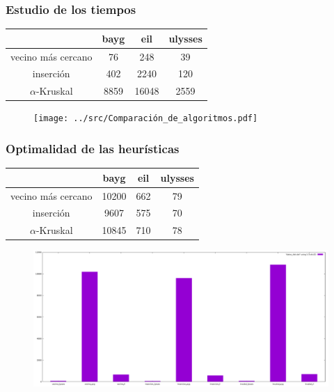 \documentclass[13pt]{beamer}
\begin{document}
	\begin{frame}
		\frametitle{Estudio de los tiempos}

		
		\begin{table}[H]
			\centering
			\begin{tabular}{|c|c|c|c|}
			  \hline
			  & bayg & eil & ulysses \\
			  \hline
			  vecino más cercano & 76 & 248 & 39 \\
			  \hline
			  inserción & 402 & 2240 & 120 \\
			  \hline
			  $\alpha$-Kruskal & 8859 & 16048 & 2559 \\
			  \hline
			\end{tabular}
		\end{table}

		\begin{figure}[H]
			\centering
			\texttt{[image: ../src/Comparación\_de\_algoritmos.pdf]}
		\end{figure}

	\end{frame}

	\begin{frame}
		\frametitle{Optimalidad de las heurísticas}
		
		\begin{table}[H]
			\centering
			\begin{tabular}{|c|c|c|c|}
			\hline
			& bayg & eil & ulysses \\
			\hline
			vecino más cercano & 10200 & 662 & 79 \\
			\hline
			inserción & 9607 & 575 & 70 \\
			\hline
			$\alpha$-Kruskal & 10845 & 710 & 78 \\
			\hline
			\end{tabular}
		\end{table}	

		\begin{figure}[H]
			\centering
			\includegraphics[scale=0.15]{../src/Comparacion_distancias.pdf}
		\end{figure}
	\end{frame}
\end{document}

